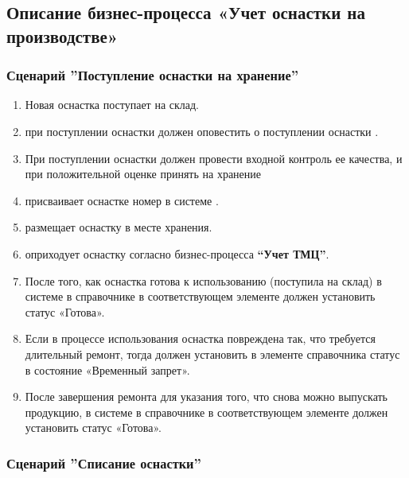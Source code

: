 \subsection{Описание бизнес-процесса «Учет оснастки на производстве»}

\subsubsection{Сценарий ''Поступление оснастки на хранение''}
\label{bp:tool_1}

\begin{enumerate}

\item Новая оснастка поступает на склад. 
\item \kladovshik при поступлении оснастки должен оповестить о поступлении оснастки \preproductionspecialist.
\item 	При поступлении оснастки \preproductionspecialist должен провести входной контроль ее качества, и при положительной оценке принять на хранение
\item 	\preproductionspecialist присваивает оснастке номер в системе \gofro.
\item 	\preproductionspecialist размещает оснастку в месте хранения.
\item 	\kladovshik оприходует оснастку согласно бизнес-процесса \textbf{“Учет ТМЦ”}.
\item 	После того, как оснастка готова к использованию (поступила на склад) \preproductionspecialist в системе \gofro в справочнике  в соответствующем элементе должен установить статус «Готова».
\item 	Если в процессе использования оснастка повреждена так, что требуется длительный ремонт, тогда \preproductionspecialist должен установить в элементе справочника  статус в состояние «Временный запрет». 
\item 	После завершения ремонта для указания того, что снова можно выпускать продукцию, \preproductionspecialist в системе \gofro в справочнике  в соответствующем элементе должен установить статус «Готова».
\end{enumerate}

\subsubsection{Сценарий ''Списание оснастки''}
\label{bp:tool_2}

